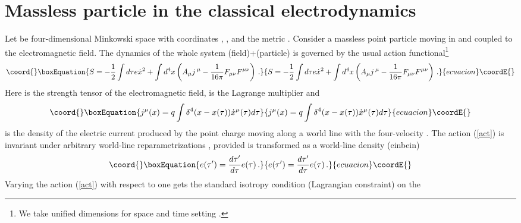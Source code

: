 \documentclass[a4paper,12pt]{article}
\begin{document}
\section{Massless particle in the classical electrodynamics}



Let \coordHE{} be four-dimensional Minkowski space with
coordinates \coordHE{}, \coordHE{}, and the metric
\coordHE{}. Consider a massless point
particle moving in \coordHE{} and coupled to the
electromagnetic field. The dynamics of the whole system
(field)+(particle) is governed by the usual action
functional\footnote{We take unified dimensions for space and time
setting \coordHE{}.}
\begin{equation}\coord{}\boxEquation{\label{act}
S=-\frac12\int d\tau e\dot{x}^2 +\int d^4x \left( A_{\mu}j
\,{}^{\mu}-\frac{1}{16\pi} F_{\mu\nu}F^{\mu\nu}\right)\,.
}{S=-\frac12\int d\tau e\dot{x}^2 +\int d^4x \left( A_{\mu}j
\,{}^{\mu}-\frac{1}{16\pi} F_{\mu\nu}F^{\mu\nu}\right)\,.
}{ecuacion}\coordE{}\end{equation}
Here \coordHE{} is the
strength tensor of the electromagnetic field, \coordHE{} is the
Lagrange multiplier and
\begin{equation}\coord{}\boxEquation{ \label{curr}
j^{\mu}(x)=q\int{\delta^4(x-x(\tau))\dot{x}^{\mu}(\tau)d\tau}
}{ j^{\mu}(x)=q\int{\delta^4(x-x(\tau))\dot{x}^{\mu}(\tau)d\tau}
}{ecuacion}\coordE{}\end{equation}
is the density of the electric current produced by the point
charge \coordHE{} moving along a world line \coordHE{} with the
four-velocity \coordHE{}. The action
(\ref{act}) is invariant under  arbitrary world-line
reparametrizations \coordHE{}, provided \coordHE{} is
transformed as a world-line density (einbein)
\begin{equation}\coord{}\boxEquation{ \label{tp}
e(\tau')= \frac{d\tau'}{d\tau}e(\tau)\,.
}{ e(\tau')= \frac{d\tau'}{d\tau}e(\tau)\,.
}{ecuacion}\coordE{}\end{equation}
Varying the action (\ref{act}) with respect to \coordHE{} one gets the
standard isotropy condition (Lagrangian constraint) on the
\end{document}
